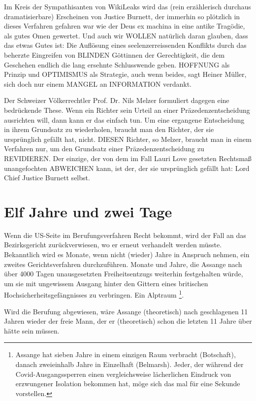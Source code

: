 \begin{multicols}{2}
Im Kreis der Sympathisanten von WikiLeaks wird das
(rein erzählerisch durchaus dramatisierbare) Erscheinen
von Justice Burnett, der immerhin so plötzlich in dieses
Verfahren gefahren war wie der Deus ex machina in eine
antike Tragödie, als gutes Omen gewertet. Und auch wir
WOLLEN natürlich daran glauben, dass das etwas Gutes
ist: Die Auflösung eines seelenzerreissenden Konflikts
durch das beherzte Eingreifen von BLINDEN Göttinnen
der Gerechtigkeit, die dem Geschehen endlich die lang
ersehnte Schlusswende geben. HOFFNUNG als Prinzip
und OPTIMISMUS als Strategie, auch wenn beides, sagt
Heiner Müller, sich doch nur einem MANGEL an INFORMATION verdankt.

Der Schweizer Völkerrechtler Prof. Dr. Nils Melzer formuliert dagegen eine bedrückende These. Wenn ein
Richter sein Urteil an einer Präzedenzentscheidung
ausrichten will, dann kann er das einfach tun. Um eine
ergangene Entscheidung in ihrem Grundsatz zu wiederholen, braucht man den Richter, der sie ursprünglich gefällt hat, nicht. DIESEN Richter, so Melzer, braucht man
in einem Verfahren nur, um den Grundsatz einer Präzedenzentscheidung zu REVIDIEREN. Der einzige, der von
dem im Fall Lauri Love gesetzten Rechtsmaß unangefochten ABWEICHEN kann, ist der, der sie ursprünglich
gefällt hat: Lord Chief Justice Burnett selbst.



\chapter{Elf Jahre und zwei Tage} %

Wenn die US-Seite im Berufungsverfahren Recht bekommt, wird der Fall an das Bezirksgericht zurückverwiesen, wo er erneut verhandelt werden müsste. Bekanntlich wird es Monate, wenn nicht (wieder) Jahre
in Anspruch nehmen, ein zweites Gerichtsverfahren
durchzuführen. Monate und Jahre, die Assange nach
über 4000 Tagen unausgesetzten Freiheitsentzugs weiterhin festgehalten würde, um sie mit ungewissem Ausgang hinter den Gittern eines britischen Hochsicherheitsgefängnisses zu verbringen. Ein Alptraum \footnote[23]{Assange hat sieben Jahre in einem einzigen Raum verbracht (Botschaft), danach zweieinhalb Jahre in Einzelhaft (Belmarsh). Jeder, der während der Covid-Ausgangssperren einen vergleichsweise lächerlichen Eindruck
von erzwungener Isolation bekommen hat, möge sich das mal für eine Sekunde vorstellen.}.

Wird die Berufung abgewiesen, wäre Assange (theoretisch) nach geschlagenen 11 Jahren wieder der freie
Mann, der er (theoretisch) schon die letzten 11 Jahre
über hätte sein müssen.


\end{multicols}
